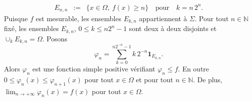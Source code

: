 {\begin{enumerate}
{\begin{eqnarray*}
E_{n, n} &:=& \{x\in\Omega,~ f(x)\geq n\} \quad \text{pour}\quad k
= n\, 2^{n}.
\end{eqnarray*}
Puisque $f$ est mesurable, les ensembles $E_{k, n}$ appartiennent
\`a $\Sigma$. Pour tout $n\in\mathbb{N}$ fix\'e, les ensembles
$E_{k,n}$, $0\leq k\leq n 2^n - 1$ sont deux \`a deux disjoints et
$\cup_{k} E_{k,n} = \Omega$. Posons
$$
\varphi_{n} = \sum_{k=0}^{n 2^{-n}-1} k\, 2^{-n} \mathbf{1}_{E_{k,n}}.
$$
Alors $\varphi_{n}$ est une fonction simple positive v\'erifiant
$\varphi_{n} \leq f$. En outre $0 \leq \varphi_{n}(x) \leq
\varphi_{n+1}(x)$ pour tout $x\in\Omega$ et pour tout
$n\in\mathbb{N}$. De plus,  $\lim_{n\rightarrow +\infty}
\varphi_{n}(x) = f(x)$ pour tout $x\in\Omega$.}
\end{enumerate}
}